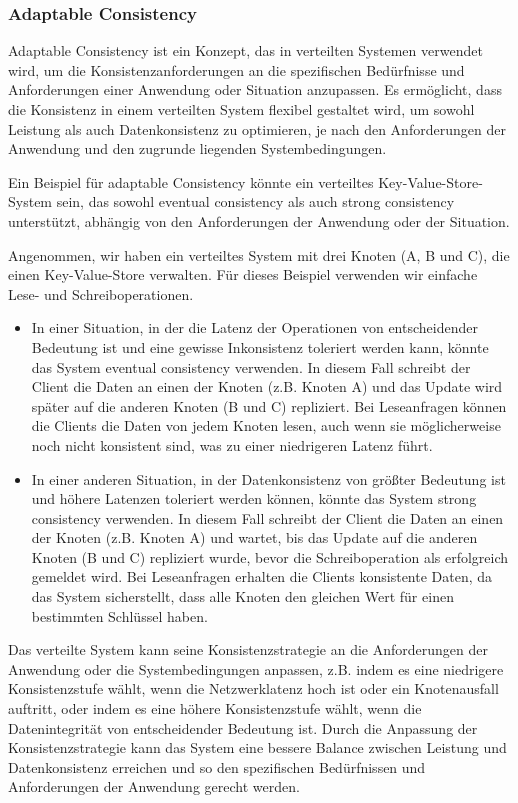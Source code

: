 \documentclass[../vs-script-first-v01.tex]{subfiles}
\begin{document}
\subsubsection{Adaptable Consistency}

Adaptable Consistency ist ein Konzept, das in verteilten Systemen verwendet wird, um die Konsistenzanforderungen an die spezifischen Bedürfnisse und Anforderungen einer Anwendung oder Situation anzupassen. Es ermöglicht, dass die Konsistenz in einem verteilten System flexibel gestaltet wird, um sowohl Leistung als auch Datenkonsistenz zu optimieren, je nach den Anforderungen der Anwendung und den zugrunde liegenden Systembedingungen.

Ein  Beispiel für adaptable Consistency könnte ein verteiltes Key-Value-Store-System sein, das sowohl eventual consistency als auch strong consistency unterstützt, abhängig von den Anforderungen der Anwendung oder der Situation.

Angenommen, wir haben ein verteiltes System mit drei Knoten (A, B und C), die einen Key-Value-Store verwalten. Für dieses Beispiel verwenden wir einfache Lese- und Schreiboperationen.
\begin{itemize}
\item In einer Situation, in der die Latenz der Operationen von entscheidender Bedeutung ist und eine gewisse Inkonsistenz toleriert werden kann, könnte das System eventual consistency verwenden. In diesem Fall schreibt der Client die Daten an einen der Knoten (z.B. Knoten A) und das Update wird später auf die anderen Knoten (B und C) repliziert. Bei Leseanfragen können die Clients die Daten von jedem Knoten lesen, auch wenn sie möglicherweise noch nicht konsistent sind, was zu einer niedrigeren Latenz führt.
\item In einer anderen Situation, in der Datenkonsistenz von größter Bedeutung ist und höhere Latenzen toleriert werden können, könnte das System strong consistency verwenden. In diesem Fall schreibt der Client die Daten an einen der Knoten (z.B. Knoten A) und wartet, bis das Update auf die anderen Knoten (B und C) repliziert wurde, bevor die Schreiboperation als erfolgreich gemeldet wird. Bei Leseanfragen erhalten die Clients konsistente Daten, da das System sicherstellt, dass alle Knoten den gleichen Wert für einen bestimmten Schlüssel haben.
\end{itemize}
Das verteilte System kann seine Konsistenzstrategie an die Anforderungen der Anwendung oder die Systembedingungen anpassen, z.B. indem es eine niedrigere Konsistenzstufe wählt, wenn die Netzwerklatenz hoch ist oder ein Knotenausfall auftritt, oder indem es eine höhere Konsistenzstufe wählt, wenn die Datenintegrität von entscheidender Bedeutung ist. Durch die Anpassung der Konsistenzstrategie kann das System eine bessere Balance zwischen Leistung und Datenkonsistenz erreichen und so den spezifischen Bedürfnissen und Anforderungen der Anwendung gerecht werden.
\end{document}
